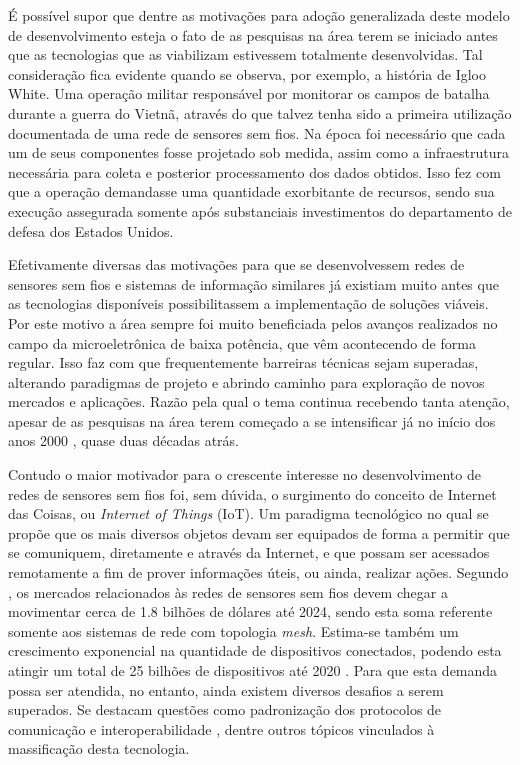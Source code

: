 \documentclass[
	12pt,				%
	openright,			%
	oneside,
	a4paper,			%
	english,			%
	french,				%
	spanish,			%
	brazil				%
	]{abntex2}
\begin{document}
É possível supor que dentre as motivações para adoção generalizada deste modelo de desenvolvimento esteja o fato de as pesquisas na área terem se iniciado antes que as tecnologias que as viabilizam estivessem totalmente desenvolvidas. Tal consideração fica evidente quando se observa, por exemplo, a história de Igloo White. Uma operação militar responsável por monitorar os campos de batalha durante a guerra do Vietnã, através do que talvez tenha sido a primeira utilização documentada de uma rede de sensores sem fios. Na época foi necessário que cada um de seus componentes fosse projetado sob medida, assim como a infraestrutura necessária para coleta e posterior processamento dos dados obtidos. Isso fez com que a operação demandasse uma quantidade exorbitante de recursos, sendo sua execução assegurada somente após substanciais investimentos do departamento de defesa dos Estados Unidos.

Efetivamente diversas das motivações para que se desenvolvessem redes de sensores sem fios e sistemas de informação similares já existiam muito antes que as tecnologias disponíveis possibilitassem a implementação de soluções viáveis. Por este motivo a área sempre foi muito beneficiada pelos avanços realizados no campo da microeletrônica de baixa potência, que vêm acontecendo de forma regular. Isso faz com que frequentemente barreiras técnicas sejam superadas, alterando paradigmas de projeto e abrindo caminho para exploração de novos mercados e aplicações. Razão pela qual o tema continua recebendo tanta atenção, apesar de as pesquisas na área terem começado a se intensificar já no início dos anos 2000 \cite{Kahn2000, Pottie2000, Heinzelman2000}, quase duas décadas atrás.

Contudo o maior motivador para o crescente interesse no desenvolvimento de redes de sensores sem fios foi, sem dúvida, o surgimento do conceito de Internet das Coisas, ou \textit{Internet of Things} (IoT). Um paradigma tecnológico no qual se propõe que os mais diversos objetos devam ser equipados de forma a permitir que se comuniquem, diretamente e através da Internet, e que possam ser acessados remotamente a fim de prover informações úteis, ou ainda, realizar ações. Segundo \cite{Harrop2014}, os mercados relacionados às redes de sensores sem fios devem chegar a movimentar cerca de 1.8 bilhões de dólares até 2024, sendo esta soma referente somente aos sistemas de rede com topologia \textit{mesh}. Estima-se também um crescimento exponencial na quantidade de dispositivos conectados, podendo esta atingir um total de 25 bilhões de dispositivos até 2020 \cite{Want2015}. Para que esta demanda possa ser atendida, no entanto, ainda existem diversos desafios a serem superados. Se destacam questões como padronização dos protocolos de comunicação e interoperabilidade \cite{Rawat2014, IEC2014}, dentre outros tópicos vinculados à massificação desta tecnologia. 
\end{document}
